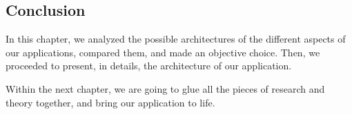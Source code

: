 \begin{toexclude}
  \section{Conclusion}

  In this chapter, we analyzed the possible architectures of the different aspects of our applications, compared them, and made an objective choice.
  Then, we proceeded to present, in details, the architecture of our application.

  Within the next chapter, we are going to glue all the pieces of research and theory together, and bring our application to life.

\end{toexclude}
